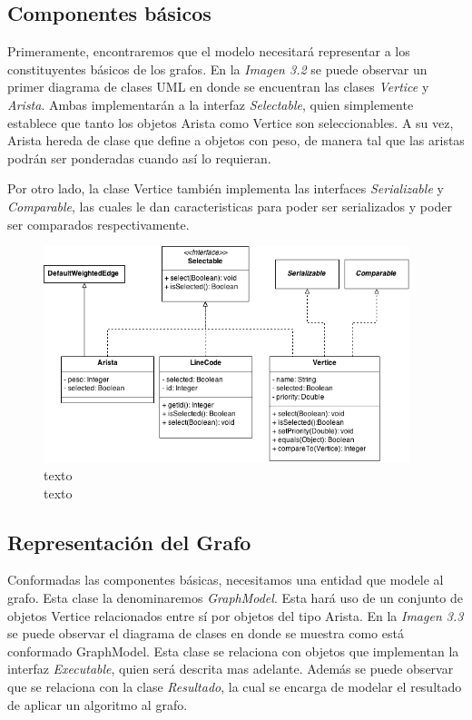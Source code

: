 \documentclass{book}
\begin{document}
\subsection{Componentes básicos}

Primeramente, encontraremos que el modelo necesitará representar a los constituyentes básicos de los grafos. En la \textit{Imagen 3.2} se puede observar un primer diagrama de clases UML en donde se encuentran las clases \textit{Vertice} y \textit{Arista}. Ambas implementarán a la interfaz \textit{Selectable}, quien simplemente establece que tanto los objetos Arista como Vertice son seleccionables. A su vez, Arista hereda de clase que define a objetos con peso, de manera tal que las aristas podrán ser ponderadas cuando así lo requieran.
\par
Por otro lado, la clase Vertice también implementa las interfaces \textit{Serializable} y \textit{Comparable}, las cuales le dan caracteristicas para poder ser serializados y poder ser comparados respectivamente.
\bigskip\bigskip


\begin{figure}[H]
	\centering
	\includegraphics[width=0.95\textwidth]{images/01-01.png}
	\medskip
	\caption{texto \\ texto}
	\medskip
\end{figure}
\medskip



\subsection{Representación del Grafo}

Conformadas las componentes básicas, necesitamos una entidad que modele al grafo. Esta clase la denominaremos \textit{GraphModel}. Esta hará uso de un conjunto de objetos Vertice relacionados entre sí por objetos del tipo Arista. En la \textit{Imagen 3.3} se puede observar el diagrama de clases en donde se muestra como está conformado GraphModel. Esta clase se relaciona con objetos que implementan la interfaz \textit{Executable}, quien será descrita mas adelante. Además se puede observar que se relaciona con la clase \textit{Resultado}, la cual se encarga de modelar el resultado de aplicar un algoritmo al grafo.
\bigskip\bigskip 
\end{document}
